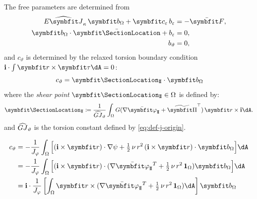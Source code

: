 The free parameters are determined from
\begin{equation}
\begin{aligned}
\CoupleRigidity \,\bm{b}_{\Section}+ \AxialCoupling\,b_\varepsilon &=-\ShearRxn,\\
\bm{b}_{\Section}\cdot\CentroidLocation+b_\varepsilon&=0,\\
b_\vartheta&=0,
\end{aligned}
\label{eq:2-18}
\end{equation}
and \(c_\vartheta\) is determined by the relaxed torsion boundary condition \(\FrameBasis\cdot\int \bm{r}\times\bm{\tau}\dA = 0\):
\begin{equation}
\,c_\vartheta
= \CenterShearLocation\cdot\bm{b}_{\Section}
\label{eq:iesan-2-22}
\end{equation}
where the \emph{shear point} \(\CenterShearLocation\in\Section\) is defined by:
\begin{equation}
\CenterShearLocation \coloneq \frac{1}{\TwistRigidity} \int_\Section G(\nabla\WarpShearShape{} + \PlaneShearShape^\top)\,\bm{r} \times \FrameBasis \dA.
\label{eq:def-shear-center}
\end{equation}
and \(\widehat{GJ}_{\vartheta}\) is the torsion constant defined by \eqref{eq:def-j-origin}.

\begin{Details}
\[
\begin{aligned}
c_{\vartheta} &=- \frac{1}{\Jsv}\int_{\Section} \Big[(\FrameBasis\times \bm{r})\cdot \nabla \WarpShearIesan
+ \tfrac{1}{2}\,\nu\, r^2 \,(\FrameBasis\times \bm{r})\cdot \bm{b}_{\Section}\Big]\dA \\
 &=- \frac{1}{\Jsv}\int_{\Section} \Big[(\FrameBasis\times \bm{r})\cdot (\nabla \WarpShearShape{}^T
+ \tfrac{1}{2}\,\nu\, r^2 \,\oneS) \bm{b}_{\Section}\Big]\dA \\
 &= \FrameBasis\cdot\frac{1}{\Jsv}\left[\int_{\Section} \bm{r}\times (\nabla \WarpShearShape{}^T
+ \tfrac{1}{2}\,\nu\, r^2 \,\oneS)\dA \right] \bm{b}_{\Section} \\
\end{aligned}
\]
\end{Details}


